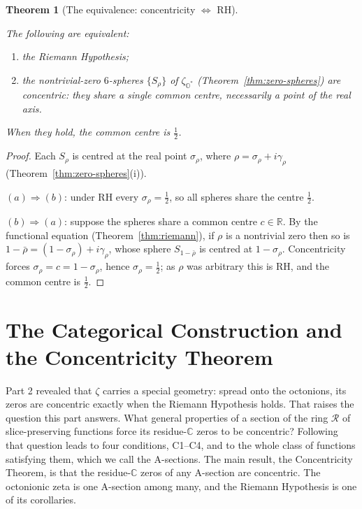 \documentclass[11pt]{article}
\newcommand{\OO}{\mathbb{O}}
\newcommand{\CC}{\mathbb{C}}
\newcommand{\RR}{\mathbb{R}}
\newcommand{\Ostar}{\OO^{*}}
\newcommand{\zetaO}{\zeta_{\Ostar}}
\providecommand{\lean}[1]{}
\providecommand{\uses}[1]{}
\theoremstyle{plain}
\newtheorem{theorem}{Theorem}[section]
\theoremstyle{definition}
\theoremstyle{remark}
\begin{document}
\begin{theorem}[The equivalence: concentricity $\Leftrightarrow$ RH]\label{thm:rh-equiv}
\lean{riemannHypothesis_iff_concentric}
\uses{thm:zero-spheres, thm:riemann}
The following are equivalent:
\begin{enumerate}[leftmargin=2.4em]
\item[(a)] the Riemann Hypothesis;
\item[(b)] the nontrivial-zero $6$-spheres $\{S_\rho\}$ of $\zetaO$
  (Theorem~\ref{thm:zero-spheres}) are \emph{concentric}: they share a single common
  centre, necessarily a point of the real axis.
\end{enumerate}
When they hold, the common centre is $\tfrac12$.
\end{theorem}
\begin{proof}
Each $S_\rho$ is centred at the real point $\sigma_\rho$, where
$\rho=\sigma_\rho+i\gamma_\rho$ (Theorem~\ref{thm:zero-spheres}(i)).

$(a)\Rightarrow(b)$: under RH every $\sigma_\rho=\tfrac12$, so all spheres share the
centre $\tfrac12$.

$(b)\Rightarrow(a)$: suppose the spheres share a common centre $c\in\RR$. By the functional
equation (Theorem~\ref{thm:riemann}), if $\rho$ is a nontrivial zero then so is
$1-\bar\rho=(1-\sigma_\rho)+i\gamma_\rho$, whose sphere $S_{1-\bar\rho}$ is centred at
$1-\sigma_\rho$. Concentricity forces $\sigma_\rho=c=1-\sigma_\rho$, hence
$\sigma_\rho=\tfrac12$; as $\rho$ was arbitrary this is RH, and the common centre is $\tfrac12$.
\end{proof}

\part{The Categorical Construction and the Concentricity Theorem}\label{part:stack}

Part 2 revealed that $\zeta$ carries a special geometry: spread onto the octonions, its zeros are
concentric exactly when the Riemann Hypothesis holds. That raises the question this part answers.
What general properties of a section of the ring $\mathcal R$ of slice-preserving functions force
its residue-$\CC$ zeros to be concentric? Following that question leads to four conditions,
\textup{C1--C4}, and to the whole class of functions satisfying them, which we call the A-sections.
The main result, the Concentricity Theorem, is that the residue-$\CC$ zeros of any A-section are
concentric. The octonionic zeta is one A-section among many, and the Riemann Hypothesis is one of
its corollaries.
\end{document}
